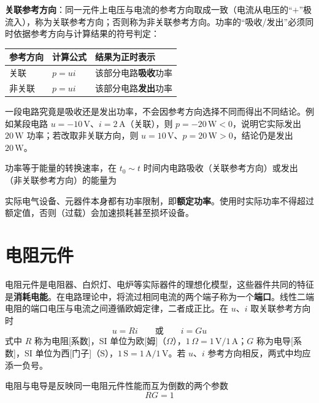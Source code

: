 \textbf{关联参考方向}：同一元件上电压与电流的参考方向取成一致（电流从电压的“$+$”极流入），称为关联参考方向；否则称为非关联参考方向。功率的“吸收/发出”必须同时依据参考方向与计算结果的符号判定：

\begin{center}
\begin{tabular}{@{}lll@{}}
\toprule
参考方向 & 计算公式 & 结果为正时表示 \\
\midrule
关联 & $p=ui$ & 该部分电路\textbf{吸收}功率 \\
非关联 & $p=ui$ & 该部分电路\textbf{发出}功率 \\
\bottomrule
\end{tabular}
\end{center}

一段电路究竟是吸收还是发出功率，不会因参考方向选择不同而得出不同结论。例如某段电路 $u=-10\,\mathrm{V}$、$i=2\,\mathrm{A}$（关联），则 $p=-20\,\mathrm{W}<0$，说明它实际发出 $20\,\mathrm{W}$ 功率；若改取非关联方向，则 $u=10\,\mathrm{V}$、$p=20\,\mathrm{W}>0$，结论仍是发出 $20\,\mathrm{W}$。

功率等于能量的转换速率，在 $t_0\sim t$ 时间内电路吸收（关联参考方向）或发出（非关联参考方向）的能量为

实际电气设备、元器件本身都有功率限制，即\textbf{额定功率}。使用时实际功率不得超过额定值，否则（过载）会加速损耗甚至损坏设备。


\section{电阻元件}
电阻元件是电阻器、白炽灯、电炉等实际器件的理想化模型，这些器件共同的特征是\textbf{消耗电能}。在电路理论中，将流过相同电流的两个端子称为一个\textbf{端口}。线性二端电阻的端口电压与电流之间遵循欧姆定律，二者成正比。在 $u$、$i$ 取关联参考方向时
\begin{equation}
u=Ri \qquad\text{或}\qquad i=Gu
\end{equation}
式中 $R$ 称为电阻[系数]，SI 单位为欧[姆]（$\Omega$），$1\,\Omega=1\,\mathrm{V}/1\,\mathrm{A}$；$G$ 称为电导[系数]，SI 单位为西[门子]（$\mathrm{S}$），$1\,\mathrm{S}=1\,\mathrm{A}/1\,\mathrm{V}$。若 $u$、$i$ 参考方向相反，两式中均应添一负号。

电阻与电导是反映同一电阻元件性能而互为倒数的两个参数
\begin{equation}
RG=1
\end{equation}


